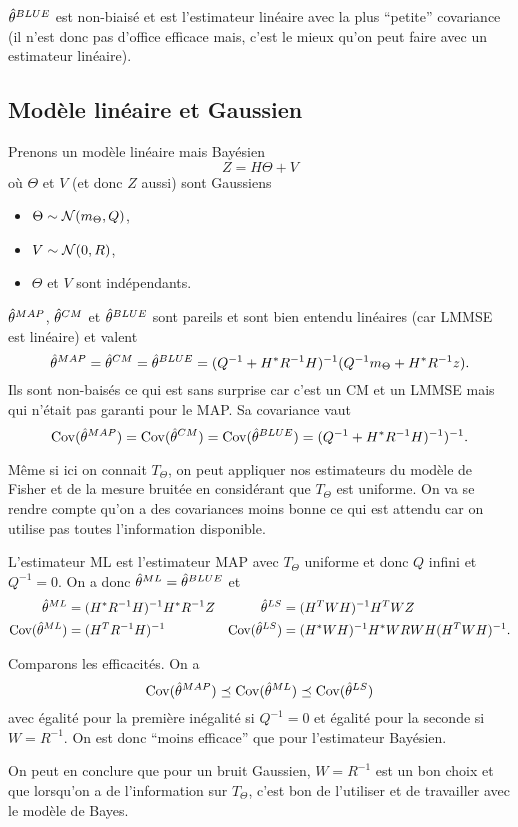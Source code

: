 $\hat{\theta}^{BLUE}$ est non-biaisé et est l'estimateur linéaire avec la plus ``petite'' covariance
(il n'est donc pas d'office efficace mais, c'est le mieux qu'on peut faire avec un estimateur linéaire).

\subsection{Modèle linéaire et Gaussien}
\label{sec:lingauss}
Prenons un modèle linéaire mais Bayésien
\[ Z = H\Theta + V \]
où $\Theta$ et $V$ (et donc $Z$ aussi) sont Gaussiens
\begin{itemize}
  \item $\Theta \sim \mathcal{N}(m_\Theta, Q)$,
  \item $V \sim \mathcal{N}(0, R)$,
  \item $\Theta$ et $V$ sont indépendants.
\end{itemize}

$\hat{\theta}^{MAP}$, $\hat{\theta}^{CM}$ et $\hat{\theta}^{BLUE}$ sont pareils et sont
bien entendu linéaires (car LMMSE est linéaire) et valent
\[ \hat{\theta}^{MAP} = \hat{\theta}^{CM} = \hat{\theta}^{BLUE} = (Q^{-1} + H^*R^{-1}H)^{-1}(Q^{-1}m_\Theta + H^*R^{-1}z). \]
Ils sont non-baisés ce qui est sans surprise car c'est un CM et un LMMSE
mais qui n'était pas garanti pour le MAP.
Sa covariance vaut
\[ \operatorname{Cov}(\hat{\theta}^{MAP}) = \operatorname{Cov}(\hat{\theta}^{CM}) = \operatorname{Cov}(\hat{\theta}^{BLUE}) = (Q^{-1} + H^*R^{-1}H)^{-1})^{-1}. \]

Même si ici on connait $T_\Theta$, on peut
appliquer nos estimateurs du modèle de Fisher et
de la mesure bruitée en considérant que $T_\Theta$ est uniforme.
On va se rendre compte qu'on a des covariances moins bonne ce
qui est attendu car on utilise pas toutes l'information disponible.

L'estimateur ML est l'estimateur MAP avec $T_\Theta$ uniforme et
donc $Q$ infini et $Q^{-1} = 0$.
On a donc $\hat{\theta}^{ML} = \hat{\theta}^{BLUE}$ et
\begin{align*}
  \hat{\theta}^{ML} & = (H^*R^{-1}H)^{-1}H^*R^{-1}Z &
  \hat{\theta}^{LS} & = (H^TWH)^{-1}H^TWZ\\
  \operatorname{Cov}(\hat{\theta}^{ML}) & = (H^TR^{-1}H)^{-1} &
  \operatorname{Cov}(\hat{\theta}^{LS}) & = (H^*WH)^{-1}H^*WRWH(H^TWH)^{-1}.
\end{align*}

Comparons les efficacités. On a
\[ \operatorname{Cov}(\hat{\theta}^{MAP}) \preceq \operatorname{Cov}(\hat{\theta}^{ML}) \preceq \operatorname{Cov}(\hat{\theta}^{LS}) \]
avec égalité pour la première inégalité si $Q^{-1} = 0$ et
égalité pour la seconde si $W = R^{-1}$.
On est donc ``moins efficace'' que pour l'estimateur Bayésien.

On peut en conclure que pour un bruit Gaussien, $W = R^{-1}$
est un bon choix et que lorsqu'on a de l'information sur $T_\Theta$,
c'est bon de l'utiliser et de travailler avec le modèle de Bayes.


